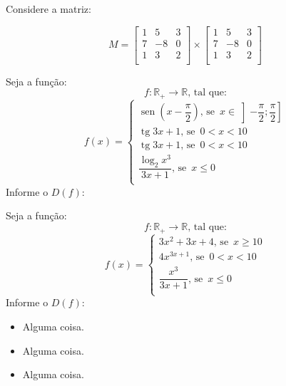 \documentclass[a4paper,12pt]{article}
\DeclareMathOperator{\sen}{sen}
\DeclareMathOperator{\tg}{tg}
\begin{document}
Considere a matriz:

$$M = 
\begin{bmatrix}
  1 & 5 & 3 \\
  7 & -8 & 0 \\
  1 & 3 & 2 \\
\end{bmatrix} \times
\begin{bmatrix}
  1 & 5 & 3 \\
  7 & -8 & 0 \\
  1 & 3 & 2 \\
\end{bmatrix}
$$
  
 
Seja a função:
$$ f : \mathbb{R}_{+} \to \mathbb{R}\textrm{, tal que:}$$
$$ f(x) = 
 \begin{cases}
 \sen\left(x - \dfrac{\pi}{2}\right) \textrm{, se }\,x \in \left] -\dfrac{\pi}{2} ; \dfrac{\pi}{2}\right] \\
 \tg{3x + 1}\textrm{, se }\,0 < x < 10 \\ 
 \tg{3x + 1}\textrm{, se }\,0 < x < 10 \\ 
 \dfrac{\log_2{x^3}}{3x + 1}\textrm{, se }\,x \leq 0 \\ 
 \end{cases}
$$
Informe o $D(f)$:  
  
  
Seja a função:
$$ f : \mathbb{R}_{+} \to \mathbb{R}\textrm{, tal que:}$$
$$ f(x) = 
 \begin{cases}
 3x^2 + 3x + 4\textrm{, se }\,x \geq 10 \\
 4x^{3x + 1}\textrm{, se }\,0 < x < 10 \\ 
 \dfrac{x^3}{3x + 1}\textrm{, se }\,x \leq 0 \\ 
 \end{cases}
$$
Informe o $D(f)$:

  
  \begin{itemize}
    \item[\ding{51}] Alguma coisa.
    \item[\ding{52}] Alguma coisa.
    \item[\ding{53}] Alguma coisa.        
  \end{itemize}
\end{document}
